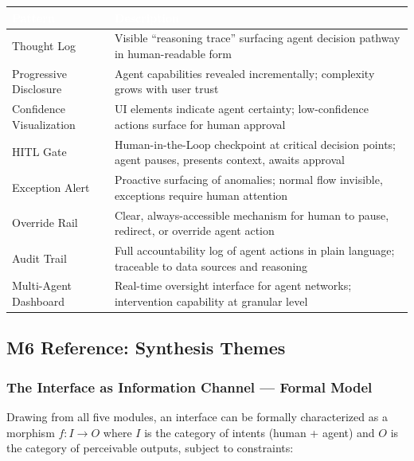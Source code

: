 \documentclass[11pt,letterpaper]{article}
\newcommand{\tableheader}[1]{\textbf{\sffamily\textcolor{white}{#1}}}
\begin{document}
\begin{center}
\begin{tabularx}{\textwidth}{L{3.5cm}X}
\toprule
{}
\tableheader{Pattern} & \tableheader{Description} \\
\midrule
Thought Log & Visible ``reasoning trace'' surfacing agent decision pathway in human-readable form \\
Progressive Disclosure & Agent capabilities revealed incrementally; complexity grows with user trust \\
Confidence Visualization & UI elements indicate agent certainty; low-confidence actions surface for human approval \\
HITL Gate & Human-in-the-Loop checkpoint at critical decision points; agent pauses, presents context, awaits approval \\
Exception Alert & Proactive surfacing of anomalies; normal flow invisible, exceptions require human attention \\
Override Rail & Clear, always-accessible mechanism for human to pause, redirect, or override agent action \\
Audit Trail & Full accountability log of agent actions in plain language; traceable to data sources and reasoning \\
Multi-Agent Dashboard & Real-time oversight interface for agent networks; intervention capability at granular level \\
\bottomrule
\end{tabularx}
\end{center}

\subsection{M6 Reference: Synthesis Themes}

\subsubsection{The Interface as Information Channel --- Formal Model}

Drawing from all five modules, an interface can be formally characterized as a morphism $f: I \to O$ where $I$ is the category of intents (human + agent) and $O$ is the category of perceivable outputs, subject to constraints:
\end{document}
